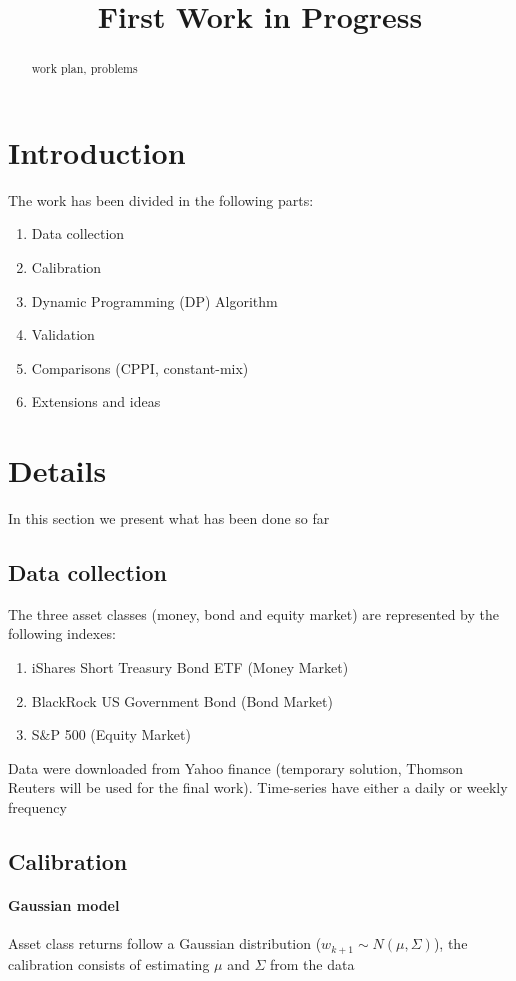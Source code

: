 \documentclass[]{article}
\title{First Work in Progress}
\author{}
\begin{document}
\maketitle

\begin{abstract}
work plan, problems 
\end{abstract}

\section{Introduction}
The work has been divided in the following parts:
\begin{enumerate}
	\item Data collection
	\item Calibration
	\item Dynamic Programming (DP) Algorithm
	\item Validation 
	\item Comparisons (CPPI, constant-mix)
	\item Extensions and ideas
\end{enumerate}

\section{Details}
In this section we present what has been done so far 
\subsection{Data collection}
The three asset classes (money, bond and equity market) are represented by the following indexes:
\begin{enumerate}
	\item iShares Short Treasury Bond ETF (Money Market)
	\item BlackRock US Government Bond (Bond Market)
	\item S\&P 500 (Equity Market)
\end{enumerate}
Data were downloaded from Yahoo finance (temporary solution, Thomson Reuters will be used for the final work).
Time-series have either a daily or weekly frequency
\subsection{Calibration}
\paragraph{Gaussian model}
Asset class returns follow a Gaussian distribution ($ w_{k+1} \sim N(\mu,\Sigma)$), the calibration consists of estimating $ \mu $ and $ \Sigma $ from the data
\end{document}
